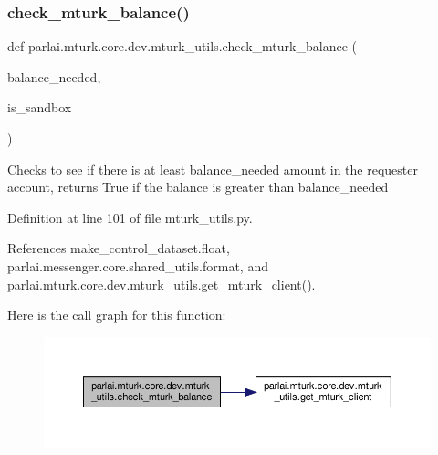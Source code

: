 \subsubsection{\texorpdfstring{check\+\_\+mturk\+\_\+balance()}{check\_mturk\_balance()}}
{\footnotesize\ttfamily def parlai.\+mturk.\+core.\+dev.\+mturk\+\_\+utils.\+check\+\_\+mturk\+\_\+balance (\begin{DoxyParamCaption}\item[{}]{balance\+\_\+needed,  }\item[{}]{is\+\_\+sandbox }\end{DoxyParamCaption})}

\begin{DoxyVerb}Checks to see if there is at least balance_needed amount in the
requester account, returns True if the balance is greater than
balance_needed
\end{DoxyVerb}
 

Definition at line 101 of file mturk\+\_\+utils.\+py.



References make\+\_\+control\+\_\+dataset.\+float, parlai.\+messenger.\+core.\+shared\+\_\+utils.\+format, and parlai.\+mturk.\+core.\+dev.\+mturk\+\_\+utils.\+get\+\_\+mturk\+\_\+client().

Here is the call graph for this function\+:
\nopagebreak
\begin{figure}[H]
\begin{center}
\leavevmode
\includegraphics[width=350pt]{namespaceparlai_1_1mturk_1_1core_1_1dev_1_1mturk__utils_af89757251500a96195029eb22e58e516_cgraph}
\end{center}
\end{figure}
\mbox{\label{namespaceparlai_1_1mturk_1_1core_1_1dev_1_1mturk__utils_aad5b4cc1ff4815272164f620b952d037}} 
